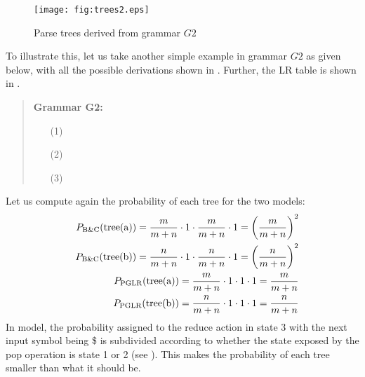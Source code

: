\documentclass[a4j]{article}
\def\BC{}
\def\fig#1{}
\def\tbl#1{}
\begin{document}
\begin{figure}[t]
  \begin{center}
    \leavevmode
    \texttt{[image: fig:trees2.eps]}
    \caption{Parse trees derived from grammar $G2$}
    \label{fig:trees2}
  \end{center}
\end{figure}

To illustrate this, let us take another simple example in grammar $G2$
as given below, with all the possible derivations shown in \fig{trees2}. 
Further, the LR table is shown in \tbl{LR-table2}.
\begin{quote}
{\bf Grammar G2:}
  \begin{itemize}\itemsep=0mm
  \item[(1)]
  \item[(2)]
  \item[(3)]
  \end{itemize}
\end{quote}
Let us compute again the probability of each tree for the two models:
\begin{eqnarray}
  &&P_{\rm B\&C}({\rm tree (a)})=
  \frac{m}{m+n}\cdot 1\cdot\frac{m}{m+n}\cdot 1=
  \left(\frac{m}{m+n}\right)^2\\
  &&P_{\rm B\&C}({\rm tree (b)})=
  \frac{n}{m+n}\cdot 1\cdot\frac{n}{m+n}\cdot 1=
  \left(\frac{n}{m+n}\right)^2\\
  &&P_{\rm PGLR}({\rm tree (a)})=
  \frac{m}{m+n}\cdot 1\cdot 1\cdot 1=\frac{m}{m+n}\\
  &&P_{\rm PGLR}({\rm tree (b)})=
  \frac{n}{m+n}\cdot 1\cdot 1\cdot 1=\frac{n}{m+n}
\end{eqnarray}
In \BC model, the probability assigned to the reduce action in state 3
with the next input symbol being {\sf \$} is subdivided according to
whether the state exposed by the pop operation is state 1 or 2 (see
\tbl{LR-table2}). This makes the probability of each tree smaller than
what it should be.
\begin{table}[t]
  \begin{center}
    \leavevmode
    \caption{LR table for grammar $G2$, with trained parameters (Each
      middle bracketed number denotes the state exposed by the
      stack-pop operation associated with the corresponding reduce
      action.)}
    \label{tbl:LR-table2}
    \small
    
  \end{center}
\end{table}
\end{document}
